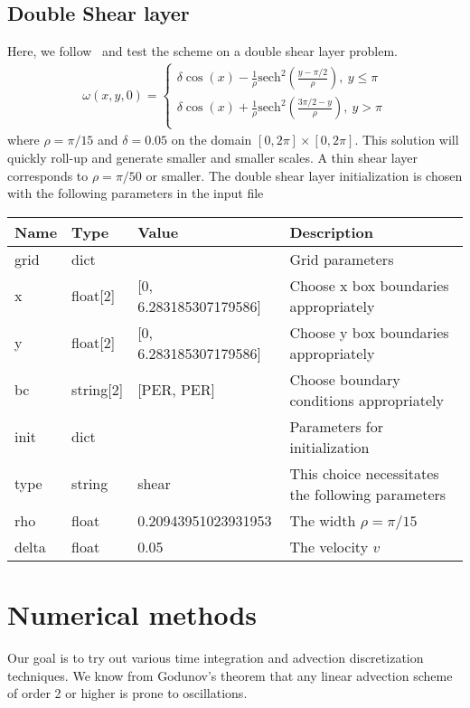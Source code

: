 \subsection{ Double Shear layer}
Here, we follow~\cite{Liu2000} and test the scheme on a double shear layer problem.
\begin{align}
    \omega(x,y,0) = \begin{cases}
        \delta \cos(x) - \frac{1}{\rho} \text{sech}^2 \left(\frac{y-\pi/2}{\rho}\right),\ y \leq \pi \\
        \delta \cos(x) + \frac{1}{\rho} \text{sech}^2 \left(\frac{3\pi/2-y}{\rho}\right),\ y > \pi \\
    \end{cases}
\end{align}
where $\rho = \pi/15$ and $\delta =0.05$ on the domain $[0,2\pi]\times [0,2\pi]$.
This solution will quickly roll-up and generate smaller and smaller scales.
A thin shear layer corresponds to $\rho = \pi/50$ or smaller.
The double shear layer initialization is chosen with the following parameters in the input file
\begin{longtable}{llll}
\toprule
\rowcolor{gray!50}\textbf{Name} &  \textbf{Type} & \textbf{Value}  & \textbf{Description}  \\ \midrule
grid & dict &  & Grid parameters \\
\qquad x & float[2]& [0, 6.283185307179586] & Choose x box boundaries appropriately \\
\qquad y & float[2]& [0, 6.283185307179586] & Choose y box boundaries appropriately \\
\qquad bc & string[2] & [PER, PER] & Choose boundary conditions appropriately \\
init &  dict &   & Parameters for initialization \\
\qquad type      & string & shear & This choice necessitates the following parameters \\
\qquad rho    & float & 0.20943951023931953 & The width $\rho = \pi/15$ \\
\qquad delta  & float & 0.05 & The velocity $v$ \\
\bottomrule
\end{longtable}

\section{Numerical methods}
Our goal is to try out various time integration and advection discretization techniques.
We know from Godunov's theorem
that any linear advection scheme of order 2 or higher is prone to oscillations.
